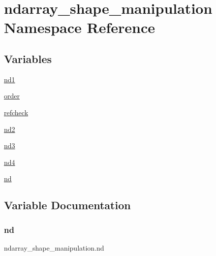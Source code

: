 \hypertarget{namespacendarray__shape__manipulation}{}\section{ndarray\+\_\+shape\+\_\+manipulation Namespace Reference}
\label{namespacendarray__shape__manipulation}
\subsection*{Variables}
\begin{DoxyCompactItemize}
\item 
\hyperlink{namespacendarray__shape__manipulation_af575df7723daf36177865e2fba85b13d}{nd1}
\item 
\hyperlink{namespacendarray__shape__manipulation_ab2aeac69e259d744c837e863d0e4ade3}{order}
\item 
\hyperlink{namespacendarray__shape__manipulation_adc29c1c7a66be4e15e350a1e1c6d72ff}{refcheck}
\item 
\hyperlink{namespacendarray__shape__manipulation_a2e37b91631eb1d5321ad2160982fa585}{nd2}
\item 
\hyperlink{namespacendarray__shape__manipulation_a9876e5f4d98d000023c4dd49bcad6345}{nd3}
\item 
\hyperlink{namespacendarray__shape__manipulation_a79cffdf5f49c00edcba09d6c4ff77fe1}{nd4}
\item 
\hyperlink{namespacendarray__shape__manipulation_a1c847a8626373ce4de935afa77447ee1}{nd}
\end{DoxyCompactItemize}


\subsection{Variable Documentation}
\mbox{\label{namespacendarray__shape__manipulation_a1c847a8626373ce4de935afa77447ee1}} 
\subsubsection{\texorpdfstring{nd}{nd}}
{\footnotesize\ttfamily ndarray\+\_\+shape\+\_\+manipulation.\+nd}

\mbox{\label{namespacendarray__shape__manipulation_af575df7723daf36177865e2fba85b13d}} 
